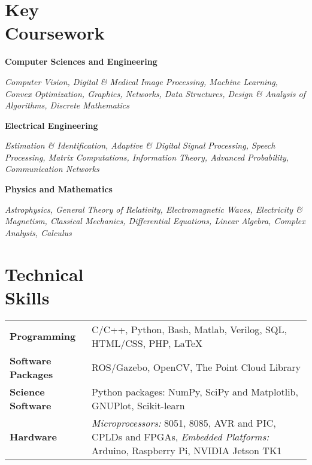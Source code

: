 \documentclass[margin,line]{res}
\newenvironment{list1}{
  \begin{list}{\ding{113}}{%
      \setlength{\itemsep}{0in}
      \setlength{\parsep}{0in} \setlength{\parskip}{0in}
      \setlength{\topsep}{0in} \setlength{\partopsep}{0in} 
      \setlength{\leftmargin}{0.17in}}}{\end{list}}
\begin{document}
\begin{resume}
\section{\sc Key \\Coursework} 
\begin{list1}
\item[\strut\hspace{0.5cm}\hypertarget{crselst}{\textbf{Computer Sciences and Engineering}}]
\item[]\textit{Computer Vision, Digital \& Medical Image Processing, Machine Learning, Convex Optimization, Graphics, Networks, Data Structures, Design \& Analysis of Algorithms, Discrete Mathematics}
\item[\strut\hspace{0.5cm}\textbf{Electrical Engineering}]
\vspace{0.05in}
\item[]\textit{Estimation \& Identification, Adaptive \& Digital Signal Processing, Speech Processing, Matrix Computations, Information Theory, Advanced Probability, Communication Networks}
\item[\strut\hspace{0.5cm}\textbf{Physics and Mathematics}]
\vspace{0.05in}
\item[]\textit{Astrophysics, General Theory of Relativity, Electromagnetic Waves, Electricity \& Magnetism, Classical Mechanics, Differential Equations, Linear Algebra, Complex Analysis, Calculus}
\end{list1}

\section{\sc Technical \\Skills} 
\begin{tabular}{@{}p{1.3in}p{4.3in}}
\textbf{Programming} & C/C++, Python, Bash, Matlab, Verilog, SQL, HTML/CSS, PHP, \LaTeX \\  
\vspace*{-0.06in}
\textbf{Software Packages} & 
\vspace*{-0.06in}
ROS/Gazebo, OpenCV, The Point Cloud Library \\ 
\vspace*{-0.06in}
\textbf{Science Software} &
\vspace*{-0.06in}
Python packages: NumPy, SciPy and Matplotlib, GNUPlot, Scikit-learn \\
\vspace*{-0.06in}
\textbf{Hardware} &
\vspace*{-0.06in}
\textit{Microprocessors:} 8051, 8085, AVR and PIC, CPLDs and FPGAs, \textit{Embedded Platforms:} Arduino, Raspberry Pi, NVIDIA Jetson TK1 \\     
\end{tabular}


\end{resume}
\end{document}
